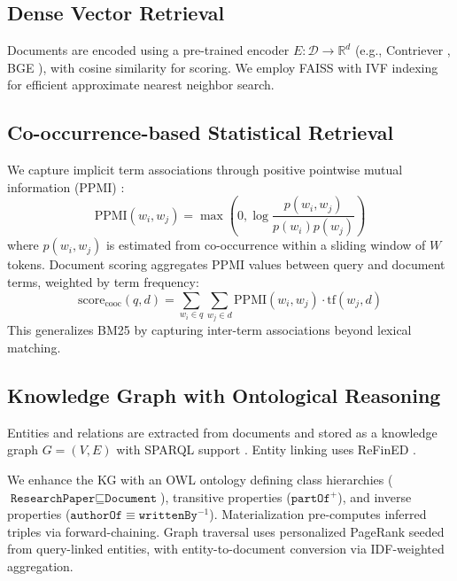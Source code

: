 \documentclass[preprint,12pt]{elsarticle}
\begin{document}
\subsection{Dense Vector Retrieval}

Documents are encoded using a pre-trained encoder $E: \mathcal{D} \rightarrow \mathbb{R}^d$ (e.g., Contriever \citep{izacard2022unsupervised}, BGE \citep{xiao2023bge}), with cosine similarity for scoring. We employ FAISS \citep{johnson2019billion} with IVF indexing for efficient approximate nearest neighbor search.

\subsection{Co-occurrence-based Statistical Retrieval}

We capture implicit term associations through positive pointwise mutual information (PPMI) \citep{church1990word,levy2014neural}:
\begin{equation}
\text{PPMI}(w_i, w_j) = \max\!\left(0, \log \frac{p(w_i, w_j)}{p(w_i) p(w_j)}\right)
\end{equation}
where $p(w_i, w_j)$ is estimated from co-occurrence within a sliding window of $W$ tokens. Document scoring aggregates PPMI values between query and document terms, weighted by term frequency:
\begin{equation}
\text{score}_{\text{cooc}}(q, d) = \sum_{w_i \in q} \sum_{w_j \in d} \text{PPMI}(w_i, w_j) \cdot \text{tf}(w_j, d)
\end{equation}
This generalizes BM25 \citep{robertson2009probabilistic} by capturing inter-term associations beyond lexical matching.

\subsection{Knowledge Graph with Ontological Reasoning}

Entities and relations are extracted from documents and stored as a knowledge graph $G = (V, E)$ with SPARQL support \citep{hogan2021knowledge}. Entity linking uses ReFinED \citep{ayoola2022refined}.

We enhance the KG with an OWL ontology \citep{baader2003description} defining class hierarchies ($\texttt{ResearchPaper} \sqsubseteq \texttt{Document}$), transitive properties ($\texttt{partOf}^+$), and inverse properties ($\texttt{authorOf} \equiv \texttt{writtenBy}^{-1}$). Materialization pre-computes inferred triples via forward-chaining. Graph traversal uses personalized PageRank \citep{haveliwala2003topic} seeded from query-linked entities, with entity-to-document conversion via IDF-weighted aggregation.
\end{document}
